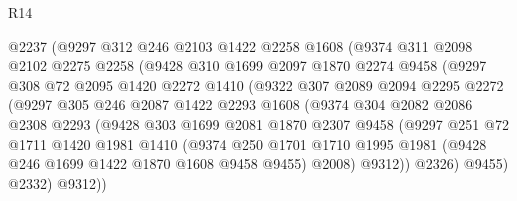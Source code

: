 \begin{lexlean}{R14}
\begin{coremodule}
                  @2237
                  (@9297
                    @312
                    @246
                    @2103
                    @1422
                    @2258
                    @1608
                    (@9374
                      @311
                      @2098
                      @2102
                      @2275
                      @2258
                      (@9428
                        @310
                        @1699
                        @2097
                        @1870
                        @2274
                        @9458
                        (@9297
                          @308
                          @72
                          @2095
                          @1420
                          @2272
                          @1410
                          (@9322
                            @307
                            @2089
                            @2094
                            @2295
                            @2272
                            (@9297
                              @305
                              @246
                              @2087
                              @1422
                              @2293
                              @1608
                              (@9374
                                @304
                                @2082
                                @2086
                                @2308
                                @2293
                                (@9428
                                  @303
                                  @1699
                                  @2081
                                  @1870
                                  @2307
                                  @9458
                                  (@9297
                                    @251
                                    @72
                                    @1711
                                    @1420
                                    @1981
                                    @1410
                                    (@9374
                                      @250
                                      @1701
                                      @1710
                                      @1995
                                      @1981
                                      (@9428 @246 @1699 @1422 @1870 @1608 @9458 @9455)
                                      @2008)
                                    @9312))
                                @2326)
                              @9455)
                            @2332)
                          @9312))

\end{coremodule}
\end{lexlean}
